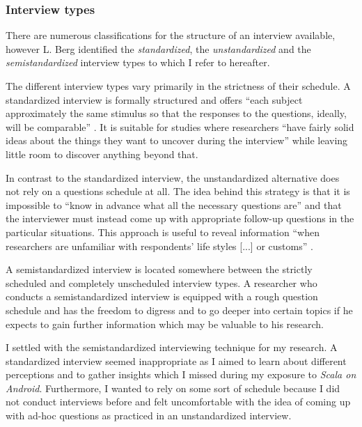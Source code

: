 \subsubsection{Interview types}

There are numerous classifications for the structure of an interview available, however L. Berg identified the \textit{standardized}, the \textit{unstandardized} and the \textit{semistandardized} interview types \cite[p. 68]{berg01} to which I refer to hereafter.

The different interview types vary primarily in the strictness of their schedule. A standardized interview is formally structured and offers \enquote{each subject approximately the same stimulus so that the responses to the questions, ideally, will be comparable} \cite[p. 69]{berg01}. It is suitable for studies where researchers \enquote{have fairly solid ideas about the things they want to uncover during the interview} \cite[p. 69]{berg01} while leaving little room to discover anything beyond that.

In contrast to the standardized interview, the unstandardized alternative does not rely on a questions schedule at all. The idea behind this strategy is that it is impossible to \enquote{know in advance what all the necessary questions are} \cite[p. 70]{berg01} and that the interviewer must instead come up with appropriate follow-up questions in the particular situations. This approach is useful to reveal information \enquote{when researchers are unfamiliar with respondents' life styles [...] or customs} \cite[p. 70]{berg01}.

A semistandardized interview is located somewhere between the strictly scheduled and completely unscheduled interview types. A researcher who conducts a semistandardized interview is equipped with a rough question schedule and has the freedom to digress and to go deeper into certain topics if he expects to gain further information which may be valuable to his research.

I settled with the semistandardized interviewing technique for my research. A standardized interview seemed inappropriate as I aimed to learn about different perceptions and to gather insights which I missed during my exposure to \textit{Scala on Android}. Furthermore, I wanted to rely on some sort of schedule because I did not conduct interviews before and felt uncomfortable with the idea of coming up with ad-hoc questions as practiced in an unstandardized interview.